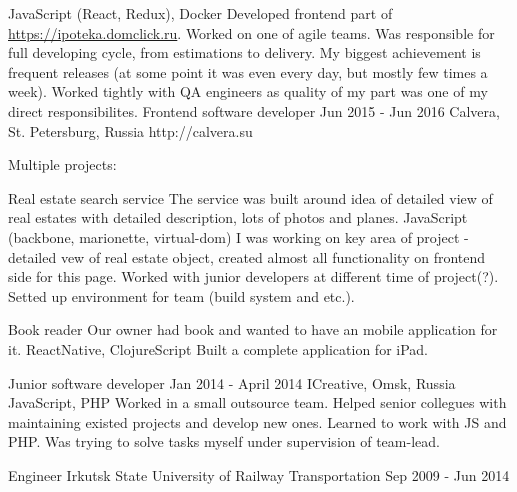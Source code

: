 \documentclass[11pt,a4paper,sans]{awesomecv}
\begin{document}
\begin{cventries}
{          {JavaScript (React, Redux), Docker}
          {
            Developed frontend part of \url{https://ipoteka.domclick.ru}.
            Worked on one of agile teams.
            Was responsible for full developing cycle, from estimations to delivery.
            My biggest achievement is frequent releases (at some point it was even
            every day, but mostly few times a week).
            Worked tightly with QA engineers as quality of my part was one of my direct responsibilites.
          }
    }
\cventry
    {Frontend software developer}
    {Jun 2015 - Jun 2016}
    {Calvera, St. Petersburg, Russia}
    {http://calvera.su}
    {
      Multiple projects:\newline
      \begin{cvprojects}{1ex}
        \item \cvproject
            {Real estate search service}
            {}
            {The service was built around idea of detailed view of real estates with detailed description, lots of photos and planes.}
            {JavaScript (backbone, marionette, virtual-dom)}
            {
              I was working on key area of project - detailed vew of real estate object,
              created almost all functionality on frontend side for this page.
              Worked with junior developers at different time of project(?).
              Setted up environment for team (build system and etc.).
            }
        \item \cvproject
            {Book reader}
            {}
            {Our owner had book and wanted to have an mobile application for it.}
            {ReactNative, ClojureScript}
            {Built a complete application for iPad.}
      \end{cvprojects}
    }
\cventry
    {Junior software developer}
    {Jan 2014 - April 2014}
    {ICreative, Omsk, Russia}{}
    {
      \cvproject
          {}{}{}
          {JavaScript, PHP}
          {
            Worked in a small outsource team.
            Helped senior collegues with maintaining existed projects and develop new ones.
            Learned to work with JS and PHP. Was trying to solve tasks myself under supervision of team-lead.
          }
    }
\end{cventries}

\begin{cventries}
\cventry
    {Engineer}
    {Irkutsk State University of Railway Transportation}
    {}
    {Sep 2009 - Jun 2014}
    {}
\end{cventries}
\end{document}
